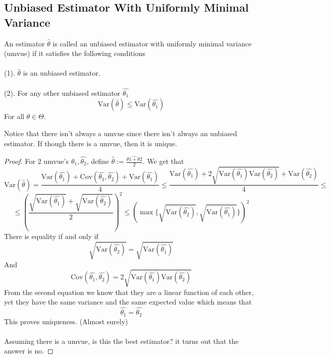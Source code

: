 \documentclass[../main.tex]{subfiles}
\begin{document}
\subsection{Unbiased Estimator With Uniformly Minimal Variance}
\begin{definition} An estimator $\hat{\theta}$ is called an unbiased estimator with uniformly minimal variance (umvue) if it satisfies the following conditions\\\\
(1). $\hat{\theta}$ is an unbiased estimator.\\\\
(2). For any other unbiased estimator $\hat{\theta_1}$ 
\[\text{Var}(\hat{\theta})\leq\text{Var}(\hat{\theta_1})\]
For all $\theta\in\Theta$. \end{definition}
Notice that there isn't always a umvue since there isn't always an unbiased estimator. If though there is a umvue, then it is unique. 
\begin{proof}
For 2 umvue's $\hat{\theta_1},\hat{\theta_2}$, define $\hat{\theta}:=\frac{\hat{\theta{1}+\theta{2}}}{2}$. We get that
\[\text{Var}(\hat{\theta})=\frac{\text{Var}(\hat{\theta_1})+\text{Cov}(\hat{\theta_1},\hat{\theta_2})+\text{Var}(\hat{\theta_1})}{4}\leq\frac{\text{Var}(\hat{\theta_1})+2\sqrt{\text{Var}(\hat{\theta_1})\text{Var}(\hat{\theta_2})} + \text{Var}(\hat{\theta_2})}{4}\leq\]\[\leq\left(\frac{\sqrt{\text{Var}(\hat{\theta_1})}+\sqrt{\text{Var}(\hat{\theta_2})}}{2}\right)^2\leq \left(\max{\{\sqrt{\text{Var}(\hat{\theta_2})},\sqrt{\text{Var}(\hat{\theta_1})}\}}\right)^2\]
There is equality if and only if \[\sqrt{\text{Var}(\hat{\theta_2})} = \sqrt{\text{Var}(\hat{\theta_1})}\]
And \[\text{Cov}(\hat{\theta_1},\hat{\theta_2}) = 2\sqrt{\text{Var}(\hat{\theta_1})\text{Var}(\hat{\theta_2})}\]
From the second equation we know that they are a linear function of each other, yet they have the same variance and the same expected value which means that 
\[\hat{\theta_1}=\hat{\theta_2}\]
This proves uniqueness. (Almost surely)\\\\
Assuming there is a umvue, is this the best estimator? it turns out that the answer is no. \end{proof}
\end{document}
